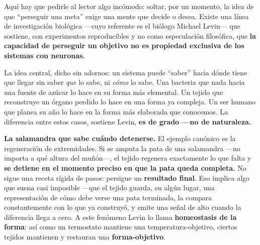 \documentclass[10pt,a4paper]{article}
\providecommand{\enquote}[1]{``#1''}
\begin{document}
Aqu\'i hay que pedirle al lector algo inc\'omodo: soltar, por un momento, la idea de que \enquote{perseguir una meta} exige una mente que decide o desea. Existe una l\'inea de investigaci\'on biol\'ogica ---cuyo referente es el bi\'ologo Michael Levin--- que sostiene, con experimentos reproducibles y no como especulaci\'on filos\'ofica, que \textbf{la capacidad de perseguir un objetivo no es propiedad exclusiva de los sistemas con neuronas.}

La idea central, dicho sin adornos: un sistema puede \enquote{saber} hacia d\'onde tiene que llegar sin saber \emph{que} lo sabe, ni \emph{c\'omo} lo sabe. Una bacteria que nada hacia una fuente de az\'ucar lo hace en su forma m\'as elemental. Un tejido que reconstruye un \'organo perdido lo hace en una forma ya compleja. Un ser humano que planea su a\~no lo hace en la forma m\'as elaborada que conocemos. La diferencia entre estos casos, sostiene Levin, \textbf{es de grado ---no de naturaleza.}

\textbf{La salamandra que sabe cu\'ando detenerse.} El ejemplo can\'onico es la regeneraci\'on de extremidades. Si se amputa la pata de una salamandra ---no importa a qu\'e altura del mu\~n\'on---, el tejido regenera exactamente lo que falta y \textbf{se detiene en el momento preciso en que la pata queda completa.} No sigue una receta r\'igida de pasos: persigue un \textbf{resultado final}. Eso implica algo que suena casi imposible ---que el tejido guarda, en alg\'un lugar, una representaci\'on de c\'omo debe verse una pata terminada, la compara constantemente con lo que ya construy\'o, y emite una se\~nal de alto cuando la diferencia llega a cero. A este fen\'omeno Levin lo llama \textbf{homeostasis de la forma}: as\'i como un termostato mantiene una temperatura-objetivo, ciertos tejidos mantienen y restauran una \textbf{forma-objetivo}.
\end{document}
